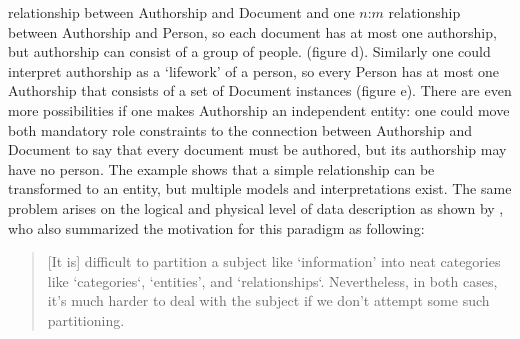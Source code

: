 relationship between {\ormtext Authorship} and {\ormtext Document} and one
$n$:$m$ relationship between {\ormtext Authorship} and {\ormtext Person}, so
each document has at most one authorship, but authorship can consist of a group
of people.  (figure {\ormtext d}). Similarly one could interpret authorship as
a `lifework' of a person, so every {\ormtext Person} has at most one {\ormtext
Authorship} that consists of a set of {\ormtext Document} instances (figure
{\ormtext e}). There are even more possibilities if one makes {\ormtext
Authorship} an independent entity: one could move both mandatory role
constraints to the connection between {\ormtext Authorship} and {\ormtext
Document} to say that every document must be authored, but its authorship may
have no person.  The example shows that a simple relationship can be
transformed to an entity, but multiple models and interpretations exist.  The
same problem arises on the logical and physical level of data description as
shown by \textcite{Kent1988}, who also summarized the motivation for this
paradigm as following:

\begin{quotation}%
{[}It is{]}	difficult to partition a subject like `information'  into neat 
categories like `categories`, `entities', and `relationships`. Nevertheless, 
in both cases, it's much harder to deal
with the subject if we don’t attempt some such partitioning.
\quotationsource \textcite[p. 15]{Kent1978}
\end{quotation}

